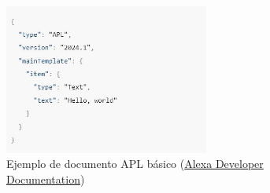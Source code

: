 \begin{figure}[H]
	\centering
	\includegraphics[width=0.6\textwidth]{imgs/apl-example.JPG}
	\caption{Ejemplo de documento APL básico (\href{https://developer.amazon.com/en-US/docs/alexa/alexa-presentation-language/apl-document.html}{Alexa Developer Documentation})}
	\label{fig:apl-ejemplo}
\end{figure}

